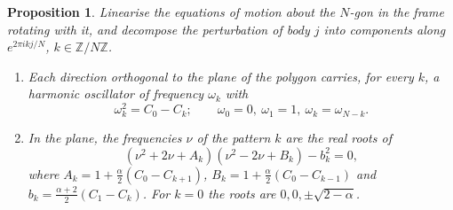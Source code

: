 \documentclass[11pt]{amsart}
\newtheorem{proposition}[theorem]{Proposition}
\theoremstyle{definition}
\newcommand{\Z}{\mathbb{Z}}
\begin{document}
\begin{proposition}\label{prop:ngon}
Linearise the equations of motion about the $N$-gon in the frame rotating with it, and decompose the perturbation of body $j$ into components along $e^{2\pi ikj/N}$, $k\in\Z/N\Z$.
\begin{enumerate}
\item Each direction orthogonal to the plane of the polygon carries, for every $k$, a harmonic oscillator of frequency $\omega_k$ with
\[
\omega_k^2=C_0-C_k;\qquad\omega_0=0,\ \omega_1=1,\ \omega_k=\omega_{N-k}.
\]
\item In the plane, the frequencies $\nu$ of the pattern $k$ are the real roots of
\begin{equation}\label{eq:quartic}
(\nu^2+2\nu+A_k)(\nu^2-2\nu+B_k)-b_k^2=0,
\end{equation}
where $A_k=1+\tfrac\alpha2(C_0-C_{k+1})$, $B_k=1+\tfrac\alpha2(C_0-C_{k-1})$ and $b_k=\tfrac{\alpha+2}2(C_1-C_k)$. For $k=0$ the roots are $0,0,\pm\sqrt{2-\alpha}$.
\end{enumerate}
\end{proposition}
\end{document}
